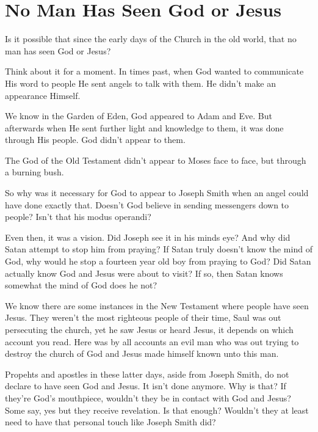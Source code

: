 \chapter{No Man Has Seen God or Jesus}

Is it possible that since the early days of the Church in the old world, that no man
has seen God or Jesus?

Think about it for a moment. In times past, when God wanted to communicate His word
to people He sent angels to talk with them. He didn't make an appearance Himself.

We know in the Garden of Eden, God appeared to Adam and Eve. But afterwards when He
sent further light and knowledge to them, it was done through His people. God didn't
appear to them.

The God of the Old Testament didn't appear to Moses face to face, but through a
burning bush.

So why was it necessary for God to appear to Joseph Smith when an angel could have
done exactly that. Doesn't God believe in sending messengers down to people? Isn't
that his modus operandi?

Even then, it was a vision. Did Joseph see it in his minds eye? And why did Satan
attempt to stop him from praying? If Satan truly doesn't know the mind of God, why
would he stop a fourteen year old boy from praying to God? Did Satan actually know
God and Jesus were about to visit? If so, then Satan knows somewhat the mind of God
does he not?

We know there are some instances in the New Testament where people have seen Jesus.
They weren't the most righteous people of their time, Saul was out persecuting the
church, yet he saw Jesus or heard Jesus, it depends on which account you read. Here
was by all accounts an evil man who was out trying to destroy the church of God and
Jesus made himself known unto this man.

Propehts and apostles in these latter days, aside from Joseph Smith, do not declare
to have seen God and Jesus. It isn't done anymore. Why is that? If they're God's
mouthpiece, wouldn't they be in contact with God and Jesus? Some say, yes but they
receive revelation. Is that enough? Wouldn't they at least need to have that personal
touch like Joseph Smith did?